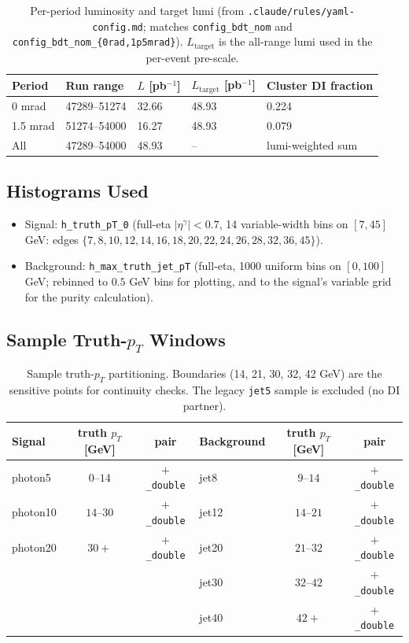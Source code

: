 \documentclass[11pt,a4paper]{article}
\newcommand{\pT}{$p_T$}
\begin{document}
\begin{table}[H]
\centering
\begin{tabular}{lllll}
\toprule
Period & Run range & $L$ [pb$^{-1}$] & $L_{\mathrm{target}}$ [pb$^{-1}$] & Cluster DI fraction \\
\midrule
0 mrad    & 47289--51274 & 32.66 & 48.93 & 0.224 \\
1.5 mrad  & 51274--54000 & 16.27 & 48.93 & 0.079 \\
All       & 47289--54000 & 48.93 & --    & lumi-weighted sum \\
\bottomrule
\end{tabular}
\caption{Per-period luminosity and target lumi (from \texttt{.claude/rules/yaml-config.md}; matches \texttt{config\_bdt\_nom} and \texttt{config\_bdt\_nom\_\{0rad,1p5mrad\}}). $L_{\mathrm{target}}$ is the all-range lumi used in the per-event pre-scale.}
\end{table}

\subsection{Histograms Used}
\begin{itemize}
  \item Signal: \texttt{h\_truth\_pT\_0} (full-eta $|\eta^\gamma|<0.7$, 14 variable-width bins on $[7, 45]$ GeV: edges $\{7, 8, 10, 12, 14, 16, 18, 20, 22, 24, 26, 28, 32, 36, 45\}$).
  \item Background: \texttt{h\_max\_truth\_jet\_pT} (full-eta, 1000 uniform bins on $[0, 100]$ GeV; rebinned to $0.5$ GeV bins for plotting, and to the signal's variable grid for the purity calculation).
\end{itemize}

\subsection{Sample Truth-\pT{} Windows}
\begin{table}[H]
\centering
\begin{tabular}{lcc|lcc}
\toprule
Signal  & truth \pT{} [GeV] & pair & Background & truth \pT{} [GeV] & pair \\
\midrule
photon5   & $0$--$14$   & $+$\texttt{\_double} & jet8   & $9$--$14$   & $+$\texttt{\_double} \\
photon10  & $14$--$30$  & $+$\texttt{\_double} & jet12  & $14$--$21$  & $+$\texttt{\_double} \\
photon20  & $30+$       & $+$\texttt{\_double} & jet20  & $21$--$32$  & $+$\texttt{\_double} \\
          &             &                      & jet30  & $32$--$42$  & $+$\texttt{\_double} \\
          &             &                      & jet40  & $42+$       & $+$\texttt{\_double} \\
\bottomrule
\end{tabular}
\caption{Sample truth-\pT{} partitioning. Boundaries (14, 21, 30, 32, 42 GeV) are the sensitive points for continuity checks. The legacy \texttt{jet5} sample is excluded (no DI partner).}
\end{table}
\end{document}
